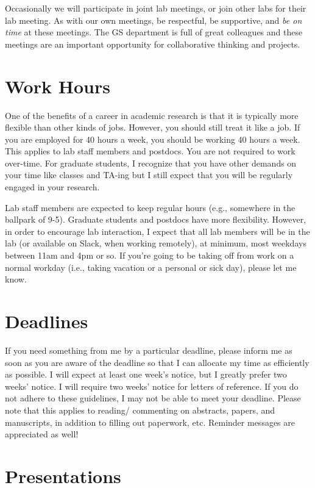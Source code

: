 \documentclass[
]{book}
\begin{document}
Occasionally we will participate in joint lab meetings, or join other labs for their lab meeting. As with our own meetings, be respectful, be supportive, and \emph{be on time} at these meetings. The GS department is full of great colleagues and these meetings are an important opportunity for collaborative thinking and projects.

\hypertarget{work-hours}{%
\section{Work Hours}\label{work-hours}}

One of the benefits of a career in academic research is that it is typically more flexible than other kinds of jobs. However, you should still treat it like a job. If you are employed for 40 hours a week, you should be working 40 hours a week. This applies to lab staff members and postdocs. You are not required to work over-time. For graduate students, I recognize that you have other demands on your time like classes and TA-ing but I still expect that you will be regularly engaged in your research.

Lab staff members are expected to keep regular hours (e.g., somewhere in the ballpark of 9-5). Graduate students and postdocs have more flexibility. However, in order to encourage lab interaction, I expect that all lab members will be in the lab (or available on Slack, when working remotely), at minimum, most weekdays between 11am and 4pm or so. If you're going to be taking off from work on a normal workday (i.e., taking vacation or a personal or sick day), please let me know.

\hypertarget{deadlines}{%
\section{Deadlines}\label{deadlines}}

If you need something from me by a particular deadline, please inform me as soon as you are aware of the deadline so that I can allocate my time as efficiently as possible. I will expect at least one week's notice, but I greatly prefer two weeks' notice. I will require two weeks' notice for letters of reference. If you do not adhere to these guidelines, I may not be able to meet your deadline. Please note that this applies to reading/ commenting on abstracts, papers, and manuscripts, in addition to filling out paperwork, etc. Reminder messages are appreciated as well!

\hypertarget{presentations}{%
\section{Presentations}\label{presentations}}
\end{document}
